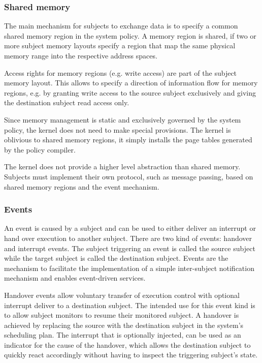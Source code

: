 \subsubsection{Shared memory}
The main mechanism for subjects to exchange data is to specify a common shared
memory region in the system policy. A memory region is shared, if two or more
subject memory layouts specify a region that map the same physical memory range
into the respective address spaces.

Access rights for memory regions (e.g. write access) are part of the subject
memory layout. This allows to specify a direction of information flow for memory
regions, e.g. by granting write access to the source subject exclusively and
giving the destination subject read access only.

Since memory management is static and exclusively governed by the system policy,
the kernel does not need to make special provisions. The kernel is oblivious to
shared memory regions, it simply installs the page tables generated by the
policy compiler.

The kernel does not provide a higher level abstraction than shared memory.
Subjects must implement their own protocol, such as message passing, based on
shared memory regions and the event mechanism.

\subsubsection{Events}\label{subsubsec:events}
An event is caused by a subject and can be used to either deliver an interrupt
or hand over execution to another subject. There are two kind of events:
handover and interrupt events. The subject triggering an event is called the
source subject while the target subject is called the destination subject.
Events are the mechanism to facilitate the implementation of a simple
inter-subject notification mechanism and enables event-driven services.

Handover events allow voluntary transfer of execution control with optional
interrupt deliver to a destination subject. The intended use for this event
kind is to allow subject monitors to resume their monitored subject. A handover
is achieved by replacing the source with the destination subject in the
system's scheduling plan. The interrupt that is optionally injected, can be
used as an indicator for the cause of the handover, which allows the
destination subject to quickly react accordingly without having to inspect the
triggering subject's state.

